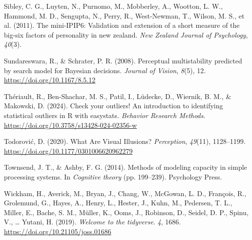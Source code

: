 \documentclass[
  man,
  floatsintext,
  longtable,
  nolmodern,
  notxfonts,
  notimes,
  colorlinks=true,linkcolor=blue,citecolor=blue,urlcolor=blue]{apa7}
\newlength{\cslhangindent}
\newenvironment{CSLReferences}[2] %
 {\begin{list}{}{%
  \setlength{\itemindent}{0pt}
  \setlength{\leftmargin}{0pt}
  \setlength{\parsep}{0pt}
  \ifodd #1
   \setlength{\leftmargin}{\cslhangindent}
   \setlength{\itemindent}{-1\cslhangindent}
  \fi
  \setlength{\itemsep}{#2\baselineskip}}}
 {\end{list}}
\begin{document}
\begin{CSLReferences}{1}{0}
Sibley, C. G., Luyten, N., Purnomo, M., Mobberley, A., Wootton, L. W.,
Hammond, M. D., Sengupta, N., Perry, R., West-Newman, T., Wilson, M. S.,
et al. (2011). The mini-IPIP6: Validation and extension of a short
measure of the big-six factors of personality in new zealand. \emph{New
Zealand Journal of Psychology}, \emph{40}(3).

Sundareswara, R., \& Schrater, P. R. (2008). Perceptual multistability
predicted by search model for Bayesian decisions. \emph{Journal of
Vision}, \emph{8}(5), 12. \url{https://doi.org/10.1167/8.5.12}

Thériault, R., Ben-Shachar, M. S., Patil, I., Lüdecke, D., Wiernik, B.
M., \& Makowski, D. (2024). Check your outliers﻿! An introduction to
identifying statistical outliers in R with easystats. \emph{Behavior
Research Methods}. \url{https://doi.org/10.3758/s13428-024-02356-w}

Todorović, D. (2020). What Are Visual Illusions? \emph{Perception},
\emph{49}(11), 1128--1199.
\url{https://doi.org/10.1177/0301006620962279}

Townsend, J. T., \& Ashby, F. G. (2014). Methods of modeling capacity in
simple processing systems. In \emph{Cognitive theory} (pp. 199--239).
Psychology Press.

Wickham, H., Averick, M., Bryan, J., Chang, W., McGowan, L. D.,
François, R., Grolemund, G., Hayes, A., Henry, L., Hester, J., Kuhn, M.,
Pedersen, T. L., Miller, E., Bache, S. M., Müller, K., Ooms, J.,
Robinson, D., Seidel, D. P., Spinu, V., \ldots{} Yutani, H. (2019).
\emph{Welcome to the {\textbraceleft}tidyverse{\textbraceright}}.
\emph{4}, 1686. \url{https://doi.org/10.21105/joss.01686}

\end{CSLReferences}
\end{document}
